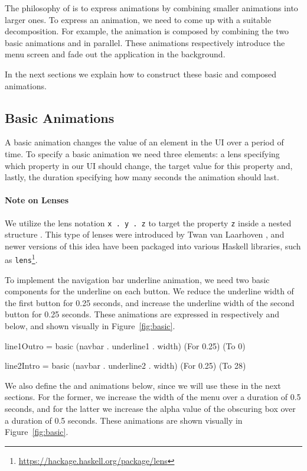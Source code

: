 The philosophy of \dsl{} is to express animations by combining smaller animations into larger ones. To express an animation, we need to come up with a suitable decomposition. For example, the  animation is composed by combining the two basic animations  and  in parallel. These animations respectively introduce the menu screen and fade out the application in the background.

In the next sections we explain how to construct these basic and composed animations.

\subsection{Basic Animations}

A basic animation changes the value of an element in the UI over a period of time. To specify a basic animation we need three elements: a lens specifying which property in our UI should change, the target value for this property and, lastly, the duration specifying how many seconds the animation should last.

\paragraph{Note on Lenses} We utilize the lens notation \texttt{x . y . z} to target the property \texttt{z} inside a nested structure . This type of lenses were introduced by Twan van Laarhoven \cite{vlLenses}, and newer versions of this idea have been packaged into various Haskell libraries, such as \texttt{lens}\footnote{\url{https://hackage.haskell.org/package/lens}}.

To implement the navigation bar underline animation, we need two basic components for the underline on each button. We reduce the underline width of the first button for 0.25 seconds, and increase the underline width of the second button for 0.25 seconds. These animations are expressed in respectively  and  below, and shown visually in Figure~\ref{fig:basic}.

\begin{spec}
line1Outro = basic (navbar . underline1 . width) (For 0.25) (To 0)

line2Intro = basic (navbar . underline2 . width) (For 0.25) (To 28)
\end{spec}

We also define the  and  animations below, since we will use these in the next sections. For the former, we increase the width of the menu over a duration of 0.5 seconds, and for the latter we increase the alpha value of the obscuring box over a duration of 0.5 seconds. These animations are shown visually in Figure~\ref{fig:basic}.

